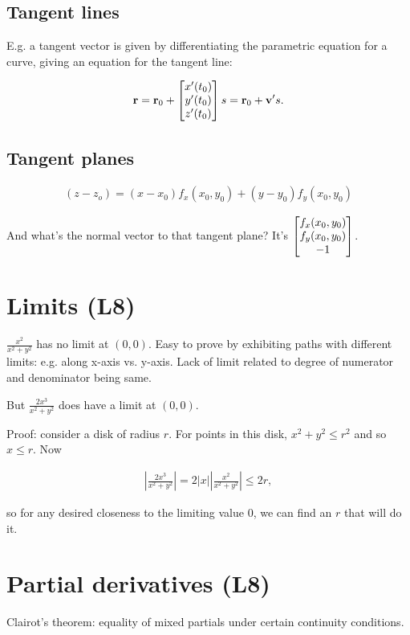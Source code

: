 \documentclass[12pt]{article}
\begin{document}
\subsection*{Tangent lines}
E.g. a tangent vector is given by differentiating the parametric equation for a
curve, giving an equation for the tangent line:

\begin{align*}
  \mathbf{r} = \mathbf{r}_0 + \begin{bmatrix}x'(t_0)\\y'(t_0)\\z'(t_0)\end{bmatrix}s = \mathbf{r}_0 + \mathbf{v}' s.
\end{align*}

\subsection*{Tangent planes}

\begin{align*}
  (z - z_o) = (x - x_0)f_x(x_0, y_0) + (y - y_0)f_y(x_0, y_0)
\end{align*}

And what's the normal vector to that tangent plane? It's
$\begin{bmatrix}f_x(x_0, y_0)\\f_y(x_0, y_0)\\-1\end{bmatrix}$.


\section{Limits (L8)}

$\frac{x^2}{x^2 + y^2}$ has no limit at $(0, 0)$.
Easy to prove by exhibiting paths with different limits: e.g. along x-axis vs. y-axis.
Lack of limit related to degree of numerator and denominator being same.

But $\frac{2x^3}{x^2 + y^2}$ does have a limit at $(0, 0)$.

Proof: consider a disk of radius $r$. For points in this disk, $x^2 + y^2 \leq r^2$ and so $x \leq r$.
Now

\begin{align*}
  \left|\frac{2x^3}{x^2 + y^2}\right| = 2|x|\left|\frac{x^2}{x^2 + y^2}\right| \leq 2r,
\end{align*}

so for any desired closeness to the limiting value 0, we can find an $r$ that will do it.

\section{Partial derivatives (L8)}

Clairot's theorem: equality of mixed partials under certain continuity
conditions.
\end{document}

